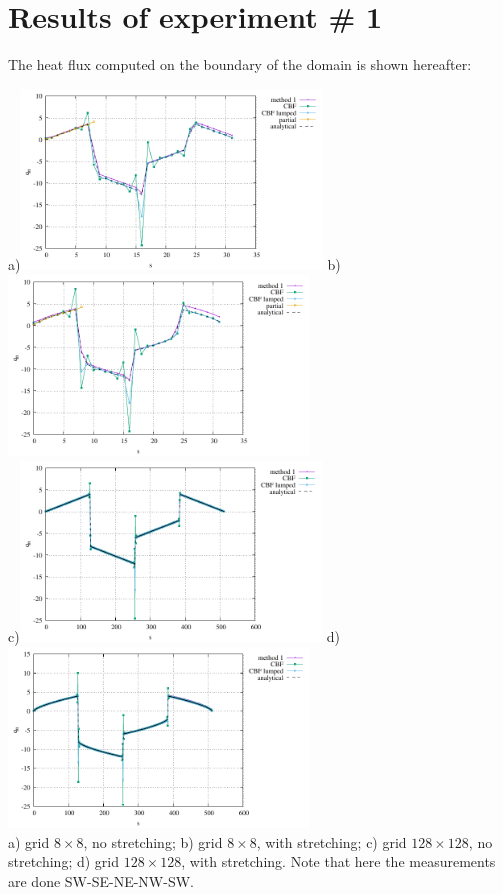 \newpage
\section*{Results of experiment \# 1}

The heat flux computed on the boundary of the domain is shown hereafter:

\begin{center}
a)\includegraphics[width=8cm]{python_codes/fieldstone_173/results/exp1/CBF1/heat_flux_boundary.pdf}
b)\includegraphics[width=8cm]{python_codes/fieldstone_173/results/exp1/CBF2/heat_flux_boundary.pdf}\\
c)\includegraphics[width=8cm]{python_codes/fieldstone_173/results/exp1/CBF3/heat_flux_boundary.pdf}
d)\includegraphics[width=8cm]{python_codes/fieldstone_173/results/exp1/CBF4/heat_flux_boundary.pdf}\\
{\captionfont a) grid $8\times 8$, no stretching; b) grid $8\times 8$, with stretching;
c) grid $128\times 128$, no stretching; d) grid $128\times 128$, with stretching. 
Note that here the measurements are done SW-SE-NE-NW-SW.}
\end{center}

